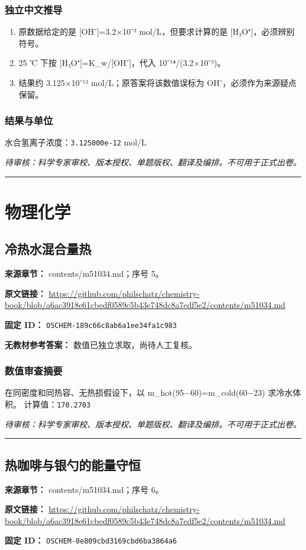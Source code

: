 \documentclass[UTF8,11pt,oneside,openany,fontset=none]{ctexbook}
\begin{document}
\subsection*{独立中文推导}
\begin{enumerate}
\item 原数据给定的是 [OH⁻]=3.2×10⁻³ mol/L，但要求计算的是 [H₃O⁺]，必须辨别符号。
\item 25 ℃ 下按 [H₃O⁺]=K\_w/[OH⁻]，代入 10⁻¹⁴/(3.2×10⁻³)。
\item 结果约 3.125×10⁻¹² mol/L；原答案将该数值误标为 OH⁻，必须作为来源疑点保留。
\end{enumerate}
\subsection*{结果与单位}
\noindent 水合氢离子浓度：\texttt{3.125000e-12} mol/L\par
\noindent\textit{待审核：科学专家审校、版本授权、单题版权、翻译及编排。不可用于正式出卷。}
\medskip\hrule\medskip
\chapter{物理化学}
\section{冷热水混合量热}
\noindent\textbf{来源章节：} contents/m51034.md；序号 5。\par
\noindent\textbf{原文链接：} \url{https://github.com/philschatz/chemistry-book/blob/a6ac3918e61cbedf0589c5b43e748dc8a7edf5e2/contents/m51034.md}\par
\noindent\textbf{固定 ID：} \texttt{OSCHEM-189c66c8ab6a1ee34fa1c983}\par
\textbf{无教材参考答案：} 数值已独立求取，尚待人工复核。\par
\subsection*{数值审查摘要}
在同密度和同热容、无热损假设下，以 m\_hot(95−60)=m\_cold(60−23) 求冷水体积。
\noindent 计算值：\texttt{170.2703}\par
\noindent\textit{待审核：科学专家审校、版本授权、单题版权、翻译及编排。不可用于正式出卷。}
\medskip\hrule\medskip
\section{热咖啡与银勺的能量守恒}
\noindent\textbf{来源章节：} contents/m51034.md；序号 6。\par
\noindent\textbf{原文链接：} \url{https://github.com/philschatz/chemistry-book/blob/a6ac3918e61cbedf0589c5b43e748dc8a7edf5e2/contents/m51034.md}\par
\noindent\textbf{固定 ID：} \texttt{OSCHEM-0e809cbd3169cbd6ba3864a6}\par
\end{document}
